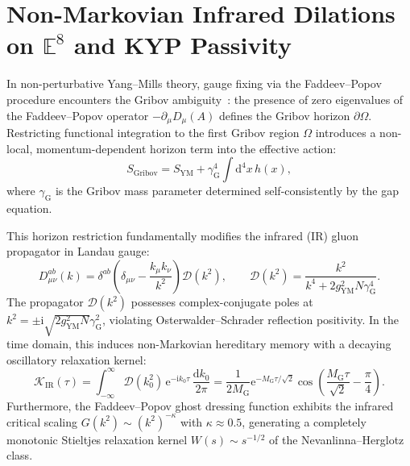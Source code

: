 \documentclass[11pt,a4paper,reqno]{article}
\theoremstyle{plain}
\theoremstyle{definition}
\theoremstyle{remark}
\numberwithin{equation}{section}
\providecommand{\diff}{\mathrm{d}}
\begin{document}
\section{Non-Markovian Infrared Dilations on \texorpdfstring{$\mathbb{E}^8$}{E\textasciicircum 8} and KYP Passivity}
\label{sec:kyp_passivity_ym}

In non-perturbative Yang--Mills theory, gauge fixing via the Faddeev--Popov procedure encounters the Gribov ambiguity~\cite{Gribov1978, Zwanziger1989}: the presence of zero eigenvalues of the Faddeev--Popov operator $-\partial_\mu D_\mu(A)$ defines the Gribov horizon $\partial\Omega$. Restricting functional integration to the first Gribov region $\Omega$ introduces a non-local, momentum-dependent horizon term into the effective action:
\begin{equation}
  S_{\mathrm{Gribov}} = S_{\mathrm{YM}} + \gamma_{\mathrm{G}}^4 \int \diff^4 x \, h(x),
\end{equation}
where $\gamma_{\mathrm{G}}$ is the Gribov mass parameter determined self-consistently by the gap equation.

This horizon restriction fundamentally modifies the infrared (IR) gluon propagator in Landau gauge:
\begin{equation}
  D_{\mu\nu}^{ab}(k) = \delta^{ab} \left( \delta_{\mu\nu} - \frac{k_\mu k_\nu}{k^2} \right) \mathcal{D}(k^2), \qquad \mathcal{D}(k^2) = \frac{k^2}{k^4 + 2 g_{\mathrm{YM}}^2 N \gamma_{\mathrm{G}}^4}.
  \label{eq:gribov_propagator}
\end{equation}
The propagator $\mathcal{D}(k^2)$ possesses complex-conjugate poles at $k^2 = \pm \mathrm{i} \sqrt{2 g_{\mathrm{YM}}^2 N} \gamma_{\mathrm{G}}^2$, violating Osterwalder--Schrader reflection positivity. In the time domain, this induces non-Markovian hereditary memory with a decaying oscillatory relaxation kernel:
\begin{equation}
  \mathcal{K}_{\mathrm{IR}}(\tau) = \int_{-\infty}^\infty \mathcal{D}(k_0^2) \, \mathrm{e}^{-\mathrm{i} k_0 \tau} \, \frac{\diff k_0}{2\pi} = \frac{1}{2 M_{\mathrm{G}}} \mathrm{e}^{-M_{\mathrm{G}} \tau / \sqrt{2}} \cos\left( \frac{M_{\mathrm{G}} \tau}{\sqrt{2}} - \frac{\pi}{4} \right).
  \label{eq:gribov_memory_kernel}
\end{equation}
Furthermore, the Faddeev--Popov ghost dressing function exhibits the infrared critical scaling $G(k^2) \sim (k^2)^{-\kappa}$ with $\kappa \approx 0.5$, generating a completely monotonic Stieltjes relaxation kernel $W(s) \sim s^{-1/2}$ of the Nevanlinna--Herglotz class.
\end{document}
